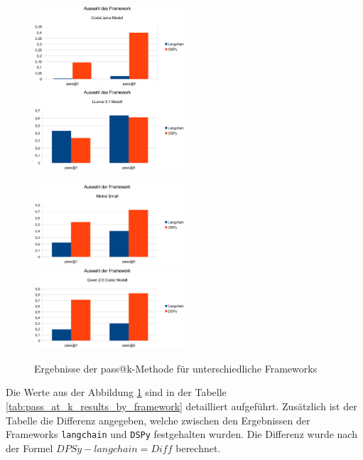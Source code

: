 \begin{figure}[!ht]
	\includegraphics[width=0.5\textwidth]{content/chapter_evaluation/images/framework_evaluation_codellama.eps}
	\includegraphics[width=0.5\textwidth]{content/chapter_evaluation/images/framework_evaluation_llama31.eps}\vspace{1cm}

	\includegraphics[width=0.5\textwidth]{content/chapter_evaluation/images/framework_evaluation_mistral-small.eps}
	\includegraphics[width=0.5\textwidth]{content/chapter_evaluation/images/framework_evaluation_qwen25-coder.eps}
	\caption{Ergebnisse der pass@k-Methode für unterschiedliche Frameworks}
	\label{img:pass_at_k_results_by_framework}
\end{figure}

Die Werte aus der Abbildung \ref{img:pass_at_k_results_by_framework} sind in der Tabelle \ref{tab:pass_at_k_results_by_framework} detailliert aufgeführt. Zusätzlich ist der Tabelle die Differenz angegeben, welche zwischen den Ergebnissen der Frameworks \texttt{langchain} und \texttt{DSPy} festgehalten wurden. Die Differenz wurde nach der Formel $DPSy - langchain = Diff$ berechnet.

